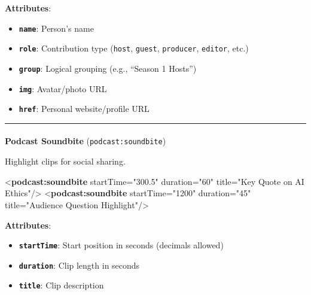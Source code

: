 \documentclass[
  letterpaper,
  DIV=11,
  numbers=noendperiod]{scrartcl}
\makeatletter
\let\oldparagraph\paragraph
\renewcommand{\paragraph}{
    \@ifstar
      \xxxParagraphStar
      \xxxParagraphNoStar
  }
\newcommand{\xxxParagraphStar}[1]{\oldparagraph*{#1}\mbox{}}
\newcommand{\xxxParagraphNoStar}[1]{\oldparagraph{#1}\mbox{}}
\newenvironment{Shaded}{\begin{snugshade}}{\end{snugshade}}
\newcommand{\KeywordTok}[1]{\textcolor[rgb]{0.00,0.23,0.31}{\textbf{#1}}}
\newcommand{\NormalTok}[1]{\textcolor[rgb]{0.00,0.23,0.31}{#1}}
\newcommand{\OtherTok}[1]{\textcolor[rgb]{0.00,0.23,0.31}{#1}}
\newcommand{\StringTok}[1]{\textcolor[rgb]{0.13,0.47,0.30}{#1}}
\providecommand{\tightlist}{%
  \setlength{\itemsep}{0pt}\setlength{\parskip}{0pt}}\usepackage{longtable,booktabs,array}
\makeatother
\begin{document}
\textbf{Attributes}:

\begin{itemize}
\tightlist
\item
  \textbf{\texttt{name}}: Person's name
\item
  \textbf{\texttt{role}}: Contribution type (\texttt{host},
  \texttt{guest}, \texttt{producer}, \texttt{editor}, etc.)
\item
  \textbf{\texttt{group}}: Logical grouping (e.g., ``Season 1 Hosts'')
\item
  \textbf{\texttt{img}}: Avatar/photo URL
\item
  \textbf{\texttt{href}}: Personal website/profile URL
\end{itemize}

\begin{center}\rule{0.5\linewidth}{0.5pt}\end{center}

\paragraph{\texorpdfstring{\textbf{Podcast Soundbite}
(\texttt{podcast:soundbite})}{Podcast Soundbite (podcast:soundbite)}}\label{podcast-soundbite-podcastsoundbite}

Highlight clips for social sharing.

\begin{Shaded}
\begin{Highlighting}[]
\NormalTok{\textless{}}\KeywordTok{podcast:soundbite}\OtherTok{ startTime=}\StringTok{"300.5"}\OtherTok{ duration=}\StringTok{"60"}\OtherTok{ title=}\StringTok{"Key Quote on AI Ethics"}\NormalTok{/\textgreater{}}
\NormalTok{\textless{}}\KeywordTok{podcast:soundbite}\OtherTok{ startTime=}\StringTok{"1200"}\OtherTok{ duration=}\StringTok{"45"}\OtherTok{ title=}\StringTok{"Audience Question Highlight"}\NormalTok{/\textgreater{}}
\end{Highlighting}
\end{Shaded}

\textbf{Attributes}:

\begin{itemize}
\tightlist
\item
  \textbf{\texttt{startTime}}: Start position in seconds (decimals
  allowed)
\item
  \textbf{\texttt{duration}}: Clip length in seconds
\item
  \textbf{\texttt{title}}: Clip description
\end{itemize}
\end{document}
